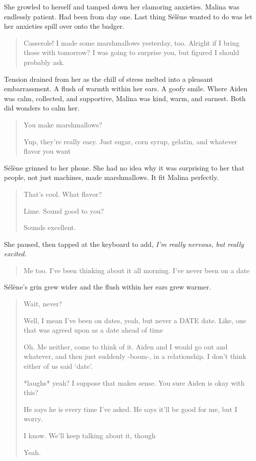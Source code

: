 She growled to herself and tamped down her clamoring anxieties. Malina was endlessly patient. Had been from day one. Last thing Sélène wanted to do was let her anxieties spill over onto the badger.

\begin{quote}
 Casserole! I made some marshmallows yesterday, too. Alright if I bring those with tomorrow? I was going to surprise you, but figured I should probably ask.
\end{quote}

Tension drained from her as the chill of stress melted into a pleasant embarrassment. A flush of warmth within her ears. A goofy smile. Where Aiden was calm, collected, and supportive, Malina was kind, warm, and earnest. Both did wonders to calm her.

\begin{quote}
 You make marshmallows?

 Yup, they're really easy. Just sugar, corn syrup, gelatin, and whatever flavor you want
\end{quote}

Sélène grinned to her phone. She had no idea why it was surprising to her that people, not just machines, made marshmallows. It fit Malina perfectly.

\begin{quote}
 That's cool. What flavor?

 Lime. Sound good to you?

 Sounds excellent.
\end{quote}

She paused, then tapped at the keyboard to add, \emph{I'm really nervous, but really excited.}

\begin{quote}
 Me too. I've been thinking about it all morning. I've never been on a date
\end{quote}

Sélène's grin grew wider and the flush within her ears grew warmer.

\begin{quote}
 Wait, never?

 Well, I mean I've been on dates, yeah, but never a DATE date. Like, one that was agreed upon as a date ahead of time

 Oh. Me neither, come to think of it. Aiden and I would go out and whatever, and then just suddenly -boom-, in a relationship. I don't think either of us said `date'.

 *laughs* yeah? I suppose that makes sense. You sure Aiden is okay with this?

 He says he is every time I've asked. He says it'll be good for me, but I worry.

 I know. We'll keep talking about it, though

 Yeah.
\end{quote}

